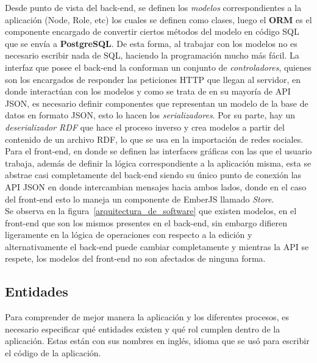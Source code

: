 Desde punto de vista del back-end, se definen los \emph{modelos} correspondientes a la aplicación (Node, Role, etc) los cuales se definen como clases, luego el \textbf{ORM} es el componente encargado de convertir ciertos métodos del modelo en código SQL que se envía a \textbf{PostgreSQL}. De esta forma, al trabajar con los modelos no es necesario escribir nada de SQL, haciendo la programación mucho más fácil. La interfaz que posee el back-end la conforman un conjunto de \emph{controladores}, quienes son los encargados de responder las peticiones HTTP que llegan al servidor, en donde interactúan con los modelos y como se trata de en su mayoría de API JSON, es necesario definir componentes que representan un modelo de la base de datos en formato JSON, esto lo hacen los \emph{serializadores}. Por su parte, hay un \emph{deserializador RDF} que hace el proceso inverso y crea modelos a partir del contenido de un archivo RDF, lo que se usa en la importación de redes sociales.\\

Para el front-end, en donde se definen las interfaces gráficas con las que el usuario trabaja, además de definir la lógica correspondiente a la aplicación misma, esta se abstrae casi completamente del back-end siendo su único punto de conexión las API JSON en donde intercambian mensajes hacia ambos lados, donde en el caso del front-end esto lo maneja un componente de EmberJS llamado \emph{Store}.\\

Se observa en la figura~\ref{arquitectura_de_software} que existen modelos, en el front-end que son los mismos presentes en el back-end, sin embargo difieren ligeramente en la lógica de operaciones con respecto a la edición y alternativamente el back-end puede cambiar completamente y mientras la API se respete, los modelos del front-end no son afectados de ninguna forma.\\

\subsection{Entidades} %
\label{sub:entidades}

Para comprender de mejor manera la aplicación y los diferentes procesos, es necesario especificar qué entidades existen y qué rol cumplen dentro de la aplicación. Estas están con sus nombres en inglés, idioma que se usó para escribir el código de la aplicación.\\

